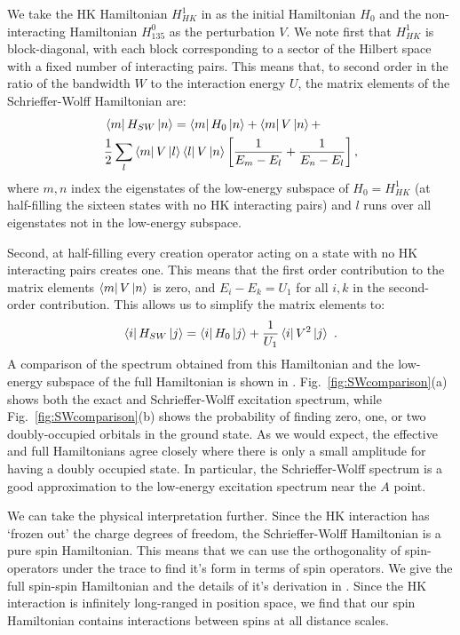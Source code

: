 \documentclass[prb,aps,amssymb,twocolumn,notitlepage]{revtex4-2}
\begin{document}
We take the HK Hamiltonian $H^{1}_{HK}$ in  as the initial Hamiltonian $H_0$ and the non-interacting Hamiltonian $H^{0}_{135}$ as the perturbation $V$.  
We note first that $H^{1}_{HK}$ is block-diagonal, with each block corresponding to a sector of the Hilbert space with a fixed number of interacting pairs.
This means that, to second order in the ratio of the bandwidth $W$ to the interaction energy $U$, the matrix elements of the Schrieffer-Wolff Hamiltonian are:
\begin{align}
&\bra{m}H_{SW}\ket{n}=\bra{m}H_{0}\ket{n}+\bra{m}V\ket{n}+\nonumber \\
&\frac{1}{2}\sum_{l}\bra{m}V\ket{l}\bra{l}V\ket{n}\left[\frac{1}{E_{m}-E_{l}}+\frac{1}{E_{n}-E_{l}}\right],
\end{align}
where $m,n$ index the eigenstates of the low-energy subspace of $H_{0}=H^{1}_{HK}$ (at half-filling the sixteen states with no HK interacting pairs) and $l$ runs over all eigenstates not in the low-energy subspace. 


Second, at half-filling every creation operator acting on a state with no HK interacting pairs creates one. 
This means that the first order contribution to the matrix elements $\bra{m}V\ket{n}$ is zero, and $E_{i}-E_{k}=U_{1}$ for all $i,k$ in the second-order contribution. 
This allows us to simplify the matrix elements to:
\begin{equation}
\label{eq:Schrieffer-Wolff}
\bra{i}H_{SW}\ket{j}=\bra{i}H_{0}\ket{j}+\frac{1}{U_{1}}\bra{i}V^{2}\ket{j}\text{ }.
\end{equation}
A comparison of the spectrum obtained from this Hamiltonian and the low-energy subspace of the full Hamiltonian is shown in . 
Fig.~\ref{fig:SWcomparison}(a) shows both the exact and Schrieffer-Wolff excitation spectrum, while Fig.~\ref{fig:SWcomparison}(b) shows the probability of finding zero, one, or two doubly-occupied orbitals in the ground state.
As we would expect, the effective and full Hamiltonians agree closely where there is only a small amplitude for having a doubly occupied state. 
In particular, the Schrieffer-Wolff spectrum is a good approximation to the low-energy excitation spectrum near the $A$ point. 

We can take the physical interpretation further. 
Since the HK interaction has `frozen out' the charge degrees of freedom, the Schrieffer-Wolff Hamiltonian is a pure spin Hamiltonian. 
This means that we can use the orthogonality of spin-operators under the trace to find it's form in terms of spin operators.
We give the full spin-spin Hamiltonian and the details of it's derivation in . 
Since the HK interaction is infinitely long-ranged in position space, we find that our spin Hamiltonian contains interactions between spins at all distance scales. 
\end{document}
